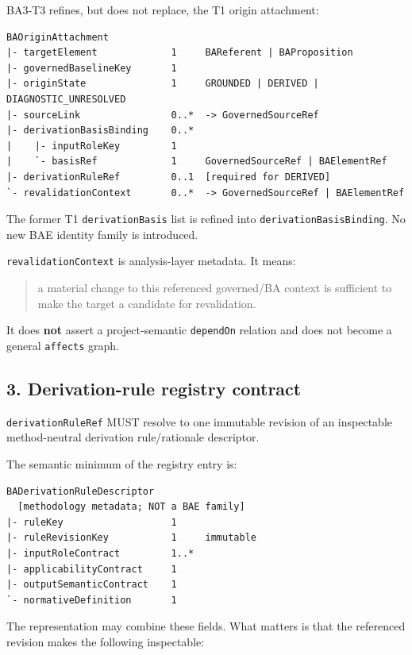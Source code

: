 \documentclass[11pt,a4paper]{article}
\begin{document}
BA3-T3 refines, but does not replace, the T1 origin attachment:

\begin{verbatim}
BAOriginAttachment
|- targetElement             1     BAReferent | BAProposition
|- governedBaselineKey       1
|- originState               1     GROUNDED | DERIVED | DIAGNOSTIC_UNRESOLVED
|- sourceLink                0..*  -> GovernedSourceRef
|- derivationBasisBinding    0..*
|    |- inputRoleKey         1
|    `- basisRef             1     GovernedSourceRef | BAElementRef
|- derivationRuleRef         0..1  [required for DERIVED]
`- revalidationContext       0..*  -> GovernedSourceRef | BAElementRef
\end{verbatim}

The former T1 \texttt{derivationBasis} list is refined into
\texttt{derivationBasisBinding}. No new BAE identity family is
introduced.

\texttt{revalidationContext} is analysis-layer metadata. It means:

\begin{quote}
a material change to this referenced governed/BA context is sufficient
to make the target a candidate for revalidation.
\end{quote}

It does \textbf{not} assert a project-semantic \texttt{dependOn}
relation and does not become a general \texttt{affects} graph.

\subsection{3. Derivation-rule registry
contract}\label{derivation-rule-registry-contract}

\texttt{derivationRuleRef} MUST resolve to one immutable revision of an
inspectable method-neutral derivation rule/rationale descriptor.

The semantic minimum of the registry entry is:

\begin{verbatim}
BADerivationRuleDescriptor
  [methodology metadata; NOT a BAE family]
|- ruleKey                   1
|- ruleRevisionKey           1     immutable
|- inputRoleContract         1..*
|- applicabilityContract     1
|- outputSemanticContract    1
`- normativeDefinition       1
\end{verbatim}

The representation may combine these fields. What matters is that the
referenced revision makes the following inspectable:
\end{document}

